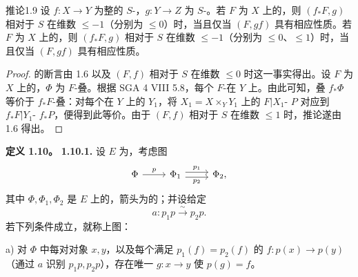 \begin{SGAresult}{推论}{1.9}
设 $f:X\to Y$ 为整的 $S$-，$g:Y\to Z$ 为 $S$-。若 $F$ 为 $X$ 上的，则 $(f_*F,g)$ 相对于 $S$ 在维数 $\leqslant-1$（分别为 $\leqslant0$）时，当且仅当 $(F,gf)$ 具有相应性质。若 $F$ 为 $X$ 上的，则 $(f_*F,g)$ 相对于 $S$ 在维数 $\leqslant-1$（分别为 $\leqslant0$、$\leqslant1$）时，当且仅当 $(F,gf)$ 具有相应性质。
\end{SGAresult}
\begin{proof}
的断言由 1.6 以及 $(F,f)$ 相对于 $S$ 在维数 $\leqslant0$ 时这一事实得出。设 $F$ 为 $X$ 上的，$\Phi$ 为 $F$-叠。根据 SGA 4 VIII 5.8，每个 $F$-在 $Y$ 上。由此可知，叠 $f_*\Phi$ 等价于 $f_*F$-叠：对每个在 $Y$ 上的 $Y_1$，将 $X_1=X\times_Y Y_1$ 上的 $F|X_1$- $P$ 对应到 $f_*F|Y_1$- $f_*P$，便得到此等价。由于 $(F,f)$ 相对于 $S$ 在维数 $\leqslant1$ 时，推论遂由 1.6 得出。
\end{proof}

\textbf{定义 1.10。}
\textbf{1.10.1.} 设 $E$ 为，考虑图
\[
\begin{tikzcd}
\Phi\arrow[r,"p"]&\Phi_1\arrow[r,shift left=.6ex,"p_1"]\arrow[r,shift right=.6ex,"p_2"']&\Phi_2,
\end{tikzcd}
\]
其中 $\Phi,\Phi_1,\Phi_2$ 是 $E$ 上的，箭头为的；并设给定
\[a:p_1p\xrightarrow{\sim}p_2p.\]
若下列条件成立，就称上图：

a) 对 $\Phi$ 中每对对象 $x,y$，以及每个满足 $p_1(f)=p_2(f)$ 的 $f:p(x)\to p(y)$（通过 $a$ 识别 $p_1p,p_2p$），存在唯一 $g:x\to y$ 使 $p(g)=f$。

